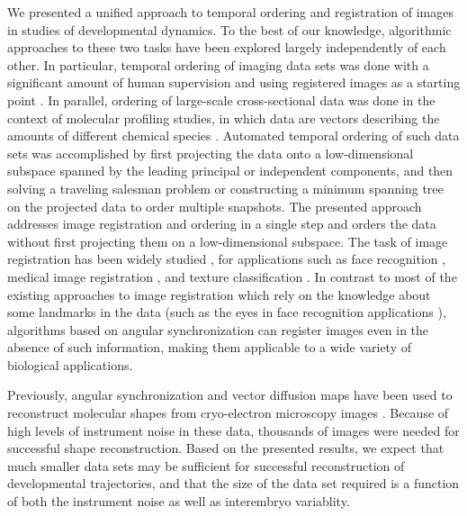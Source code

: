 \documentclass{pnastwo}
\begin{document}
\begin{article}
We presented a unified approach to temporal ordering and registration of images in studies of developmental dynamics. 
%
To the best of our knowledge, algorithmic approaches to these two tasks have been explored largely independently of each other. 
%
In particular, temporal ordering of imaging data sets was done with a significant amount of human supervision and using registered images as a starting point \cite{yuan2014automated, surkova2008characterization}.  
%
In parallel, ordering of large-scale cross-sectional data was done in the context of molecular profiling studies, in which data are vectors describing the amounts of different chemical species \cite{anavy2014blind, trapnell2014dynamics, gupta2008extracting}. 
%
Automated temporal ordering of such data sets was accomplished by first projecting the data onto a low-dimensional subspace spanned by the leading principal or independent components, and then solving a traveling salesman problem or constructing a minimum spanning tree on the projected data to order multiple snapshots. 
%
The presented approach addresses image registration and ordering in a single step and orders the data without first projecting them on a low-dimensional subspace.
%
The task of image registration has been widely studied \cite{zitova2003image}, for applications such as face recognition \cite{rowley1998rotation}, medical image registration \cite{hajnal2010medical}, and texture classification \cite{greenspan1994rotation}.
%
In contrast to most of the existing approaches to image registration which rely on the knowledge about some landmarks in the data \cite{ian1998statistical} (such as the eyes in face recognition applications \cite{zhao2003face}), algorithms based on angular synchronization can register images even in the absence of such information, making them applicable to a wide variety of biological applications. 

Previously, angular synchronization and vector diffusion maps have been used to reconstruct molecular shapes from cryo-electron microscopy images \cite{singer2012vector, zhao2014rotationally, singer2011viewing}.
%
Because of high levels of instrument noise in these data, thousands of images were needed for successful shape reconstruction. 
%
Based on the presented results, we expect that much smaller data sets may be sufficient for successful reconstruction of developmental trajectories, and that the size of the data set required is a function of both the instrument noise as well as interembryo variablity.
%
 

\end{article}
\end{document}
